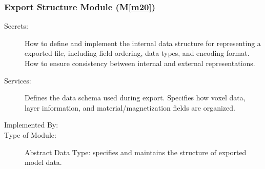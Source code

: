 \documentclass[12pt, titlepage]{article}
\newcommand{\mref}[1]{M\ref{#1}}
\begin{document}

\subsubsection{Export Structure Module (\mref{m20})}

\begin{description}
  \item[Secrets:] How to define and implement the internal data structure for representing a exported file, including field ordering, data types, and encoding format. How to ensure consistency between internal and external representations.
  \item[Services:] Defines the data schema used during export. Specifies how voxel data, layer information, and material/magnetization fields are organized. 
  \item[Implemented By:] \progname{}
  \item[Type of Module:] Abstract Data Type: specifies and maintains the structure of exported model data.
\end{description}
\end{document}
